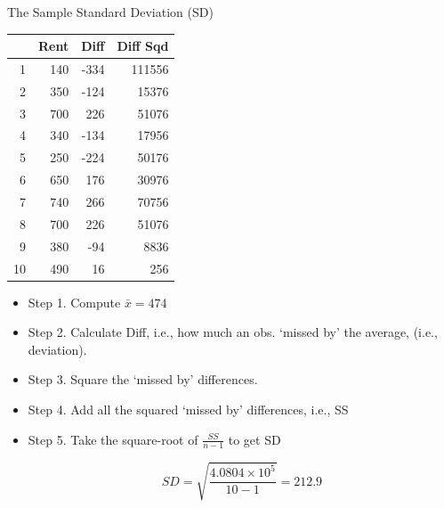 \documentclass[14pt]{beamer}\usepackage[]{graphicx}\usepackage[]{color}
\begin{document}
\begin{frame}[fragile]{The Sample Standard Deviation (SD)}

\begin{minipage}[ht]{5cm}

{\footnotesize{
\begin{table}[ht]
\centering
\begin{tabular}{rrrr}
  \hline
 & Rent & Diff & Diff Sqd \\ 
  \hline
1 & 140 & -334 & 111556 \\ 
  2 & 350 & -124 & 15376 \\ 
  3 & 700 & 226 & 51076 \\ 
  4 & 340 & -134 & 17956 \\ 
  5 & 250 & -224 & 50176 \\ 
  6 & 650 & 176 & 30976 \\ 
  7 & 740 & 266 & 70756 \\ 
  8 & 700 & 226 & 51076 \\ 
  9 & 380 & -94 & 8836 \\ 
  10 & 490 & 16 & 256 \\ 
   \hline
\end{tabular}
\end{table}

}}

\end{minipage}
\begin{minipage}[ht]{6cm}

{\footnotesize{
\begin{itemize}
\item<1-> Step 1. Compute $\bar{x} = 474$
\item<2-> Step 2. Calculate Diff, i.e., how much an obs. `missed by' the average, (i.e., deviation).
\item<3-> Step 3. Square the `missed by' differences.
\item<4-> Step 4. Add all the squared `missed by' differences, i.e., SS
\item<5-> Step 5. Take the square-root of $\frac{SS}{n - 1}$ to get SD

\begin{equation*}
SD = \sqrt{ \frac{\ensuremath{4.0804\times 10^{5}}}{ 10 - 1 }} = 212.9
\end{equation*}

\end{itemize}
}}
\end{minipage}

\end{frame}
\end{document}
